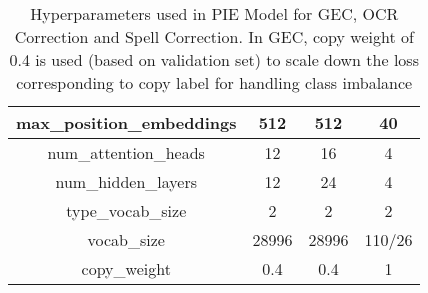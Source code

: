 \documentclass[11pt,a4paper]{article}
\begin{document}
\begin{table}[!hbt]
\begin{tabular}{|c|c|c|c|}
max\_position\_embeddings       & 512                                                     & 512                                                      & 40                                                                   \\ \hline
num\_attention\_heads           & 12                                                      & 16                                                       & 4                                                                    \\ \hline
num\_hidden\_layers             & 12                                                      & 24                                                       & 4                                                                    \\ \hline
type\_vocab\_size               & 2                                                       & 2                                                        & 2                                                                    \\ \hline
vocab\_size                     & 28996                                                   & 28996                                                    & 110/26                                                                  \\ \hline
copy\_weight                    & 0.4     & 0.4 & 1 \\ \hline
\end{tabular}

\caption {Hyperparameters used in PIE Model for GEC, OCR Correction and Spell Correction. In GEC, copy weight of 0.4 is used (based on validation set) to scale down the loss corresponding to copy label for handling class imbalance}
\label{tab:hparams_1}

\vspace{1cm}


\centering


\end{table}
\end{document}

